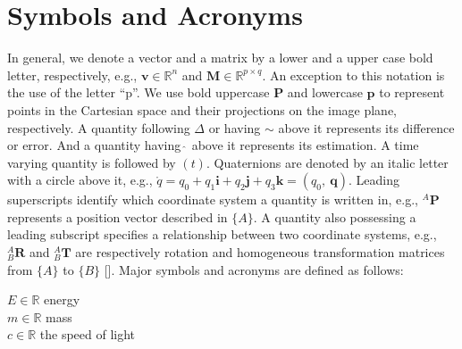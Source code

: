 \chapter*{Symbols and Acronyms}

In general, we denote a vector and a matrix by a lower and a upper case bold letter, respectively, e.g., $\mathbf{v} \in \mathbb{R}^n$ and $\mathbf{M} \in \mathbb{R}^{p \times q}$.
An exception to this notation is the use of the letter ``p''.
We use bold uppercase $\mathbf{P}$ and lowercase $\mathbf{p}$ to represent points in the Cartesian space and their projections on the image plane, respectively.
A quantity following $\Delta$ or having $\sim$ above it represents its difference or error.
And a quantity having $\widehat{\ }$ above it represents its estimation.
A time varying quantity is followed by $(t)$.
Quaternions are denoted by an italic letter with a circle above it, e.g., $\mathring{q} = q_0 + q_1\mathbf{i} + q_2\mathbf{j} + q_3\mathbf{k} = (q_0,~\mathbf{q})$.
Leading superscripts identify which coordinate system a quantity is written in, e.g., $^{A}\mathbf{P}$ represents a position vector described in $\{A\}$.
A quantity also possessing a leading subscript specifies a relationship between two coordinate systems, e.g., $^{A}_{B}\mathbf{R}$ and $^{A}_{B}\mathbf{T}$ are respectively rotation and homogeneous transformation matrices from $\{A\}$ to $\{B\}$ [\cite{craig2005introduction}].
Major symbols and acronyms are defined as follows:

\newpage

\noindent
$E \in \mathbb{R}$ \hfill energy \\
$m \in \mathbb{R}$ \hfill mass \\
$c \in \mathbb{R}$ \hfill the speed of light \\
